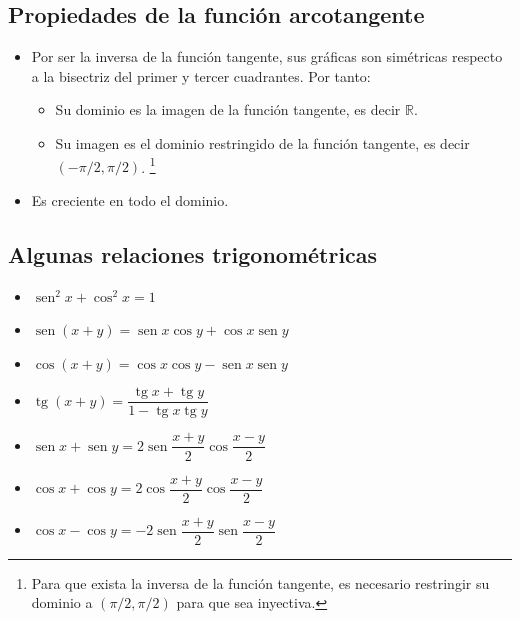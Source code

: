 \documentclass[
  a4paper,
]{scrreport}
\providecommand{\tightlist}{%
  \setlength{\itemsep}{0pt}\setlength{\parskip}{0pt}}\usepackage{longtable,booktabs,array}
\theoremstyle{plain}
\theoremstyle{plain}
\theoremstyle{definition}
\theoremstyle{definition}
\theoremstyle{plain}
\theoremstyle{remark}
\begin{document}
\hypertarget{propiedades-de-la-funciuxf3n-arcotangente}{%
\subsection{Propiedades de la función
arcotangente}\label{propiedades-de-la-funciuxf3n-arcotangente}}

\begin{itemize}
\tightlist
\item
  Por ser la inversa de la función tangente, sus gráficas son simétricas
  respecto a la bisectriz del primer y tercer cuadrantes. Por tanto:

  \begin{itemize}
  \tightlist
  \item
    Su dominio es la imagen de la función tangente, es decir
    \(\mathbb{R}\).
  \item
    Su imagen es el dominio restringido de la función tangente, es decir
    \((-\pi/2,\pi/2)\). \footnote{Para que exista la inversa de la
      función tangente, es necesario restringir su dominio a
      \((\pi/2,\pi/2)\) para que sea inyectiva.}
  \end{itemize}
\item
  Es creciente en todo el dominio.
\end{itemize}

\hypertarget{algunas-relaciones-trigonomuxe9tricas}{%
\subsection{Algunas relaciones
trigonométricas}\label{algunas-relaciones-trigonomuxe9tricas}}

\begin{itemize}
\tightlist
\item
  \(\operatorname{sen}^2 x+\cos^2 x=1\)
\item
  \(\operatorname{sen}(x+y)=\operatorname{sen} x \cos y+\cos x \operatorname{sen} y\)
\item
  \(\cos(x+y)=\cos x \cos y-\operatorname{sen} x \operatorname{sen} y\)
\item
  \(\operatorname{tg} (x+y)= \dfrac{\operatorname{tg} x+\operatorname{tg} y}{1-\operatorname{tg} x \operatorname{tg} y}\)
\item
  \(\operatorname{sen} x + \operatorname{sen} y = 2 \operatorname{sen} \dfrac{x+y}{2}\cos\dfrac{x-y}{2}\)
\item
  \(\cos x + \cos y = 2 \cos \dfrac{x+y}{2}\cos\dfrac{x-y}{2}\)
\item
  \(\cos x - \cos y = -2 \operatorname{sen} \dfrac{x+y}{2}\operatorname{sen}\dfrac{x-y}{2}\)
\end{itemize}
\end{document}
